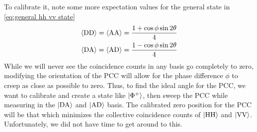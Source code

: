 \documentclass{paper}[11pt]
\begin{document}
	To calibrate it, note some more expectation values for the general state in \cref{eq:general hh vv state}
	\begin{align}
		{\langle{\text{DD}}\rangle}={\langle{\text{AA}}\rangle} &= \frac{1+\cos\phi\sin2\theta}{4} \\
		{\langle{\text{DA}}\rangle}={\langle{\text{AD}}\rangle} &= \frac{1-\cos\phi\sin2\theta}{4}
	\end{align}
	While we will never see the coincidence counts in any basis go completely to zero, modifying the orientation of the PCC will allow for the phase difference $\phi$ to creep as close as possible to zero. Thus, to find the ideal angle for the PCC, we want to calibrate and create a state like $\ket{\Phi^+}$, then sweep the PCC while measuring in the $\ket{\text{DA}}$ and $\ket{\text{AD}}$ basis. The calibrated zero position for the PCC will be that which minimizes the collective coincidence counts of $\ket{\text{HH}}$ and $\ket{\text{VV}}$. Unfortunately, we did not have time to get around to this.
\end{document}

